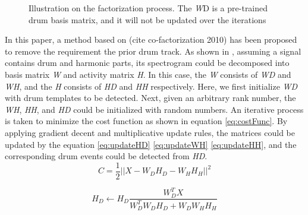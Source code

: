 \documentclass{article}
\begin{document}
\begin{figure}
 \centerline{}
 \caption{Illustration on the factorization process. The {\itshape W}{\tiny D} is a pre-trained drum basis matrix, and it will not be updated over the iterations }
 \label{fig:factorization}
\end{figure}

In this paper, a method based on (cite co-factorization 2010) has been proposed to remove the requirement the prior drum track. As shown in , assuming a signal contains drum and harmonic parts, its spectrogram could be decomposed into basis matrix {\itshape W} and activity matrix {\itshape H}. In this case, the {\itshape W} consists of {\itshape W\tiny D} and {\itshape W\tiny H}, and the {\itshape H} consists of {\itshape H\tiny D} and {\itshape H\tiny H} respectively. Here, we first initialize {\itshape W\tiny D} with drum templates to be detected. Next, given an arbitrary rank number, the {\itshape W\tiny H}, {\itshape H\tiny H}, and {\itshape H\tiny D} could be initialized with random numbers. An iterative process is taken to minimize the cost function as shown in equation \eqref{eq:costFunc}. By applying gradient decent and multiplicative update rules, the matrices could be updated by the equation \eqref{eq:updateHD} \eqref{eq:updateWH} \eqref{eq:updateHH}, and the corresponding drum events could be detected from {\itshape H\tiny D}.  
\begin{equation}
C = \frac{1}{2} || X - W_{D}H_{D} - W_{H}H_{H}||^{2}
\label{eq:costFunc}
\end{equation}

\begin{equation}
H_{D} \leftarrow H_{D}\frac{W_{D} ^T X}{W_{D}^T W_{D} H_{D} + W_{D} W_{H} H_{H}}
\label{eq:updateHD}
\end{equation}
\end{document}
